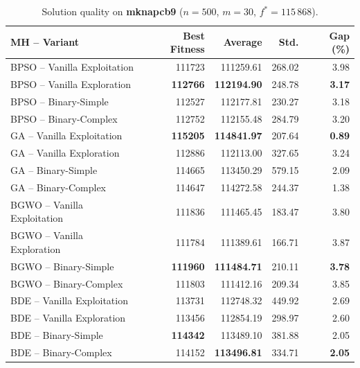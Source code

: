 \documentclass[journal,article,submit,moreauthors]{Definitions/mdpi}
\begin{document}
\begin{table}[htbp]
  \centering
  \small
  \caption{Solution quality on \textbf{mknapcb9}
  ($n=500$, $m=30$, $f^*=115\,868$).}
  \label{tab:calidad_mknapcb9}
  \begin{tabular}{lrrrr}
    \toprule
    \textbf{MH -- Variant} &
    \textbf{Best Fitness} &
    \textbf{Average} &
    \textbf{Std.} &
    \textbf{Gap (\%)} \\
    \midrule
    BPSO -- Vanilla Exploitation & 111723 & 111259.61 & 268.02 & 3.98 \\
    BPSO -- Vanilla Exploration  & \textbf{112766} & \textbf{112194.90} & 248.78 & \textbf{3.17} \\
    BPSO -- Binary-Simple        & 112527 & 112177.81 & 230.27 & 3.18 \\
    BPSO -- Binary-Complex       & 112752 & 112155.48 & 284.79 & 3.20 \\
    \midrule
    GA -- Vanilla Exploitation   & \textbf{115205} & \textbf{114841.97} & 207.64 & \textbf{0.89} \\
    GA -- Vanilla Exploration    & 112886 & 112113.00 & 327.65 & 3.24 \\
    GA -- Binary-Simple          & 114665 & 113450.29 & 579.15 & 2.09 \\
    GA -- Binary-Complex         & 114647 & 114272.58 & 244.37 & 1.38 \\
    \midrule
    BGWO -- Vanilla Exploitation & 111836 & 111465.45 & 183.47 & 3.80 \\
    BGWO -- Vanilla Exploration  & 111784 & 111389.61 & 166.71 & 3.87 \\
    BGWO -- Binary-Simple        & \textbf{111960} & \textbf{111484.71} & 210.11 & \textbf{3.78} \\
    BGWO -- Binary-Complex       & 111803 & 111412.16 & 209.34 & 3.85 \\
    \midrule
    BDE -- Vanilla Exploitation  & 113731 & 112748.32 & 449.92 & 2.69 \\
    BDE -- Vanilla Exploration   & 113456 & 112854.19 & 298.97 & 2.60 \\
    BDE -- Binary-Simple         & \textbf{114342} & 113489.10 & 381.88 & 2.05 \\
    BDE -- Binary-Complex        & 114152 & \textbf{113496.81} & 334.71 & \textbf{2.05} \\
    \bottomrule
  \end{tabular}
\end{table}
\end{document}

